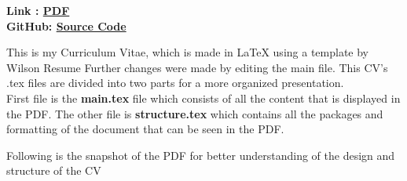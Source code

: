 \documentclass{report}
\begin{document}
{\bf Link : \href{https://github.com/tusharrbhardwaj/CV/blob/main/Tushar_CV.pdf}{\color{blue}PDF}}\\
{\bf GitHub: \href{https://github.com/tusharrbhardwaj/CV}{\color{blue}Source Code}} \\ \par
This is my Curriculum Vitae, which is made in LaTeX using a template by Wilson Resume\cite{noauthor_latex_nodate} Further changes were made by editing the main file.\cite{alexander_baran-harper_latex_2014} This CV's .tex files are divided into two parts for a more organized presentation.\\
First file is the {\bf main.tex} file which consists of all the content that is displayed in the PDF. The other file is {\bf structure.tex} which contains all the packages and formatting of the document that can be seen in the PDF.\cite{noauthor_38_nodate} \\ \par
Following is the snapshot of the PDF for better understanding of the design and structure of the CV
\end{document}
